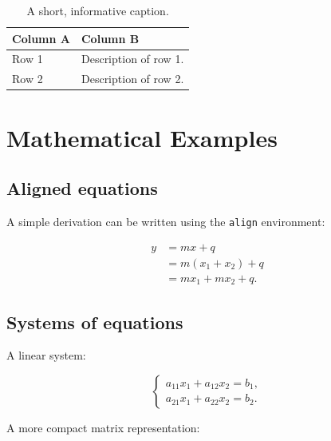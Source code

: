 \documentclass[10pt,a4paper]{scrartcl}
\newcommand{\RuleSection}[1]{%
    \section{#1}%
    \vspace{0.2em}{\color{accent!35}\hrule height 0.4pt}\vspace{0.3em}%
  }
\begin{document}
  \begin{table}[h]
  \small
  \centering
  \renewcommand{\arraystretch}{1.1}
  \begin{tabularx}{\textwidth}{@{}L{3cm} X@{}}
  \toprule
  \textbf{Column A} & \textbf{Column B} \\[.3cm]
  \midrule
  Row 1 & Description of row 1. \\[.3cm]
  Row 2 & Description of row 2. \\[.3cm]
  \bottomrule
  \end{tabularx}
  \caption{A short, informative caption.}
  \label{tab:example}
  \end{table}


  \RuleSection{Mathematical Examples}

  \subsection{Aligned equations}

  A simple derivation can be written using the \texttt{align} environment:

  \begin{align}
      y &= mx + q \\
      &= m(x_1+x_2) + q \\
      &= mx_1 + mx_2 + q .
  \end{align}


  \subsection{Systems of equations}

  A linear system:

  \[
  \begin{cases}
      a_{11}x_1 + a_{12}x_2 = b_1,\\
      a_{21}x_1 + a_{22}x_2 = b_2 .
  \end{cases}
  \]


  A more compact matrix representation:
\end{document}
